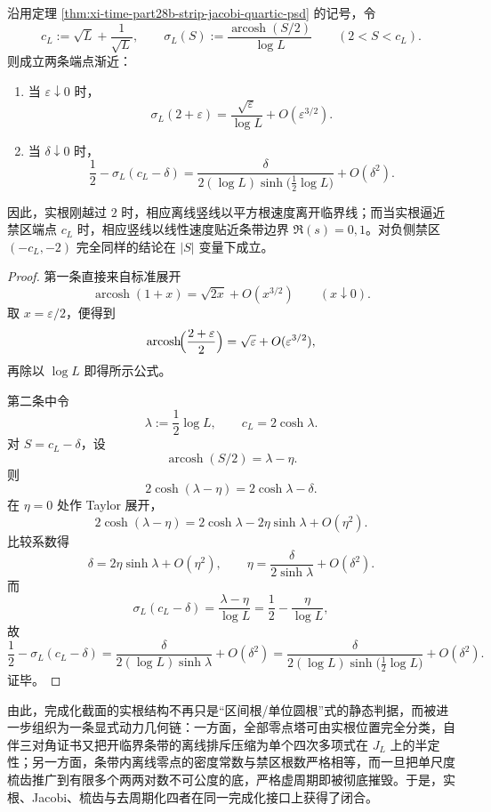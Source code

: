 \begin{theorem}\label{thm:xi-time-part28b-strip-onset-law}
沿用定理 \ref{thm:xi-time-part28b-strip-jacobi-quartic-psd} 的记号，令
\[
c_L:=\sqrt L+\frac{1}{\sqrt L},
\qquad
\sigma_L(S):=\frac{\operatorname{arcosh}(S/2)}{\log L}
\qquad (2<S<c_L).
\]
则成立两条端点渐近：
\begin{enumerate}
  \item 当 \(\varepsilon\downarrow 0\) 时，
  \[
  \boxed{\;
  \sigma_L(2+\varepsilon)
  =
  \frac{\sqrt{\varepsilon}}{\log L}
  +O(\varepsilon^{3/2}).\;}
  \]
  \item 当 \(\delta\downarrow 0\) 时，
  \[
  \boxed{\;
  \frac12-\sigma_L(c_L-\delta)
  =
  \frac{\delta}{2(\log L)\sinh\!\bigl(\frac12\log L\bigr)}
  +O(\delta^2).\;}
  \]
\end{enumerate}
因此，实根刚越过 \(2\) 时，相应离线竖线以平方根速度离开临界线；而当实根逼近禁区端点 \(c_L\) 时，相应竖线以线性速度贴近条带边界 \(\Re(s)=0,1\)。对负侧禁区 \((-c_L,-2)\) 完全同样的结论在 \(|S|\) 变量下成立。
\end{theorem}
\begin{proof}
第一条直接来自标准展开
\[
\operatorname{arcosh}(1+x)=\sqrt{2x}+O(x^{3/2})
\qquad(x\downarrow 0).
\]
取 \(x=\varepsilon/2\)，便得到
\[
\operatorname{arcosh}\!\Bigl(\frac{2+\varepsilon}{2}\Bigr)
=
\sqrt{\varepsilon}+O(\varepsilon^{3/2}),
\]
再除以 \(\log L\) 即得所示公式。

第二条中令
\[
\lambda:=\frac12\log L,
\qquad
c_L=2\cosh\lambda.
\]
对 \(S=c_L-\delta\)，设
\[
\operatorname{arcosh}(S/2)=\lambda-\eta.
\]
则
\[
2\cosh(\lambda-\eta)=2\cosh\lambda-\delta.
\]
在 \(\eta=0\) 处作 Taylor 展开，
\[
2\cosh(\lambda-\eta)
=
2\cosh\lambda-2\eta\sinh\lambda+O(\eta^2).
\]
比较系数得
\[
\delta=2\eta\sinh\lambda+O(\eta^2),
\qquad
\eta=\frac{\delta}{2\sinh\lambda}+O(\delta^2).
\]
而
\[
\sigma_L(c_L-\delta)
=
\frac{\lambda-\eta}{\log L}
=
\frac12-\frac{\eta}{\log L},
\]
故
\[
\frac12-\sigma_L(c_L-\delta)
=
\frac{\delta}{2(\log L)\sinh\lambda}+O(\delta^2)
=
\frac{\delta}{2(\log L)\sinh\!\bigl(\frac12\log L\bigr)}+O(\delta^2).
\]
证毕。
\end{proof}

\noindent
由此，完成化截面的实根结构不再只是“区间根/单位圆根”式的静态判据，而被进一步组织为一条显式动力几何链：一方面，全部零点塔可由实根位置完全分类，自伴三对角证书又把开临界条带的离线排斥压缩为单个四次多项式在 \(J_L\) 上的半定性；另一方面，条带内离线零点的密度常数与禁区根数严格相等，而一旦把单尺度梳齿推广到有限多个两两对数不可公度的底，严格虚周期即被彻底摧毁。于是，实根、Jacobi、梳齿与去周期化四者在同一完成化接口上获得了闭合。

\endinput
